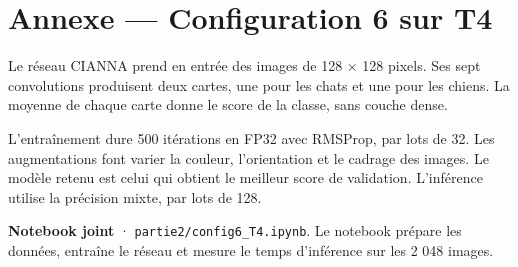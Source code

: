 \documentclass[10pt,a4paper]{article}
\begin{document}
\section*{\sffamily Annexe — Configuration 6 sur T4}

Le réseau CIANNA prend en entrée des images de 128 × 128 pixels. Ses sept convolutions produisent deux cartes, une pour les chats et une pour les chiens. La moyenne de chaque carte donne le score de la classe, sans couche dense.

L’entraînement dure 500 itérations en FP32 avec RMSProp, par lots de 32. Les augmentations font varier la couleur, l’orientation et le cadrage des images. Le modèle retenu est celui qui obtient le meilleur score de validation. L’inférence utilise la précision mixte, par lots de 128.

\textbf{Notebook joint} · \texttt{partie2/config6\_T4.ipynb}. Le notebook prépare les données, entraîne le réseau et mesure le temps d’inférence sur les 2 048 images.
\end{document}
